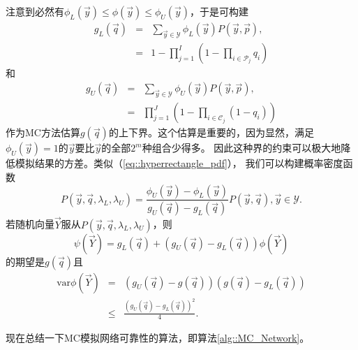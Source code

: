 注意到必然有$\phi_L(\vec{y}) \leq \phi(\vec{y}) \leq \phi_U(\vec{y})$，于是可构建
\begin{equation}
  \begin{array}{rcl}
  g_L(\vec{q}) &=&\displaystyle \sum_{\vec{y} \in \mathscr{Y}}
  \phi_L(\vec{y}) P(\vec{y}, \vec{p}),\\ &=&\displaystyle 1 - \prod_{j
    = 1}^I\left(1 - \prod_{i \in \mathscr{P}_j}q_i\right)
  \end{array}
  \label{eq::network_gl}
\end{equation}
和
\begin{equation}
  \begin{array}{rcl}
  g_U(\vec{q}) &=&\displaystyle \sum_{\vec{y} \in \mathscr{Y}}
  \phi_U(\vec{y}) P(\vec{y}, \vec{p}),\\ &=&\displaystyle
  \prod_{j = 1}^J\left(1 - \prod_{i \in \mathscr{C}_j}(1 - q_i)\right)
  \end{array}
  \label{eq::network_gu}
\end{equation}
作为MC方法估算$g(\vec{q})$的上下界。这个估算是重要的，因为显然，满足
$\phi_U(\vec{y}) = 1$的$\vec{y}$要比$\vec{y}$的全部$2^m$种组合少得多。
因此这种界的约束可以极大地降低模拟结果的方差。类似（\ref{eq::hyperrectangle_pdf}），
我们可以构建概率密度函数
\begin{equation}
  P(\vec{y}, \vec{q}, \lambda_L, \lambda_U) = \frac{\phi_U(\vec{y}) -
    \phi_L(\vec{y})}{g_U(\vec{q}) - g_L(\vec{q})}P(\vec{y}, \vec{q}), \vec{y}
  \in \mathscr{Y}.
  \label{eq::network_bound_pdf}
\end{equation}
若随机向量$\vec{Y}$服从$P(\vec{y}, \vec{q}, \lambda_L, \lambda_U)$，则
\begin{equation}
  \psi(\vec{Y}) = g_L(\vec{q}) + (g_U(\vec{q}) - g_L(\vec{q})) \phi(\vec{Y})
  \label{eq::network_bound_estimate_g}
\end{equation}
的期望是$g(\vec{q})$且
\begin{equation}
  \begin{array}{rcl}
  \mathrm{var} \phi(\vec{Y}) &=& (g_U(\vec{q}) - g(\vec{q}))
  (g(\vec{q}) - g_L(\vec{q}))\\
  & \leq& \displaystyle \frac{(g_U(\vec{q}) - g_L(\vec{q}))^2}{4}.
  \end{array}
  \label{eq::network_bound_estimate_var}
\end{equation}

现在总结一下MC模拟网络可靠性的算法，即算法\ref{alg::MC_Network}。

